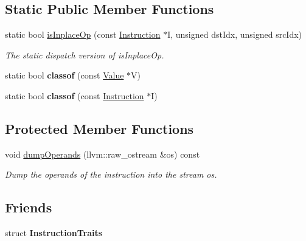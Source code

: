 \subsection*{Static Public Member Functions}
\begin{DoxyCompactItemize}
\item 
\mbox{\label{classglow_1_1_instruction_af99ddfb73c4e6ecf3391f922f21664bc}} 
static bool \hyperlink{classglow_1_1_instruction_af99ddfb73c4e6ecf3391f922f21664bc}{is\+Inplace\+Op} (const \hyperlink{classglow_1_1_instruction}{Instruction} $\ast$I, unsigned dst\+Idx, unsigned src\+Idx)
\begin{DoxyCompactList}\small\item\em The static dispatch version of is\+Inplace\+Op. \end{DoxyCompactList}\item 
\mbox{\label{classglow_1_1_instruction_aa6cadb269a9c302e2a4bbd1fcad1c6c6}} 
static bool {\bfseries classof} (const \hyperlink{classglow_1_1_value}{Value} $\ast$V)
\item 
\mbox{\label{classglow_1_1_instruction_a1df4da3756fc6213dbf68adbb9a9b1de}} 
static bool {\bfseries classof} (const \hyperlink{classglow_1_1_instruction}{Instruction} $\ast$I)
\end{DoxyCompactItemize}
\subsection*{Protected Member Functions}
\begin{DoxyCompactItemize}
\item 
\mbox{\label{classglow_1_1_instruction_aeed1aca4261382fc2daf4a05ade9e2b8}} 
void \hyperlink{classglow_1_1_instruction_aeed1aca4261382fc2daf4a05ade9e2b8}{dump\+Operands} (llvm\+::raw\+\_\+ostream \&os) const
\begin{DoxyCompactList}\small\item\em Dump the operands of the instruction into the stream {\ttfamily os}. \end{DoxyCompactList}\end{DoxyCompactItemize}
\subsection*{Friends}
\begin{DoxyCompactItemize}
\item 
\mbox{\label{classglow_1_1_instruction_a3d4b02d306f9e8057b1090c476505886}} 
struct {\bfseries Instruction\+Traits}
\end{DoxyCompactItemize}


